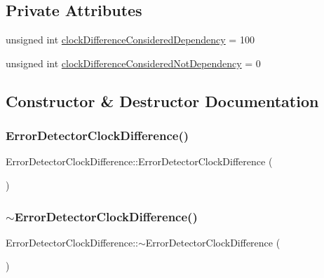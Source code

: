 \subsection*{Private Attributes}
\begin{DoxyCompactItemize}
\item 
unsigned int \hyperlink{class_error_detector_clock_difference_a0d2a3c4111e8bb4b3c232aacca9a0062}{clock\+Difference\+Considered\+Dependency} = 100
\item 
unsigned int \hyperlink{class_error_detector_clock_difference_aa733fc7d2023d62a7418ca20e01e9f5a}{clock\+Difference\+Considered\+Not\+Dependency} = 0
\end{DoxyCompactItemize}


\subsection{Constructor \& Destructor Documentation}
\mbox{\label{class_error_detector_clock_difference_a5edb355be9179cd604d3e7f946846c55}} 
\subsubsection{\texorpdfstring{Error\+Detector\+Clock\+Difference()}{ErrorDetectorClockDifference()}}
{\footnotesize\ttfamily Error\+Detector\+Clock\+Difference\+::\+Error\+Detector\+Clock\+Difference (\begin{DoxyParamCaption}{ }\end{DoxyParamCaption})}

\mbox{\label{class_error_detector_clock_difference_a19bda307bcb9a8974a97fdf56fb77b8f}} 
\subsubsection{\texorpdfstring{$\sim$\+Error\+Detector\+Clock\+Difference()}{~ErrorDetectorClockDifference()}}
{\footnotesize\ttfamily Error\+Detector\+Clock\+Difference\+::$\sim$\+Error\+Detector\+Clock\+Difference (\begin{DoxyParamCaption}{ }\end{DoxyParamCaption})\hspace{0.3cm}{\ttfamily [virtual]}}



